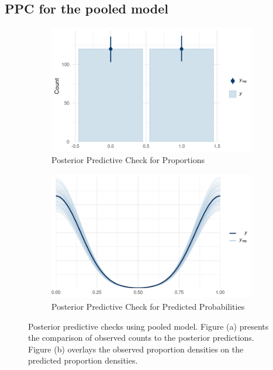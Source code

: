 \documentclass[a4paper]{artikel3}
\begin{document}
\subsection{PPC for the pooled model}
\begin{figure}[htbp]
  \centering
  \begin{subfigure}[b]{0.45\textwidth}
    \includegraphics[width=\textwidth]{ppc_log_2.png}
    \caption{Posterior Predictive Check for Proportions}
    \label{fig:ppc_proportions}
  \end{subfigure}
  \hfill %
  \begin{subfigure}[b]{0.45\textwidth}
    \includegraphics[width=\textwidth]{ppc_log_1.png}
    \caption{Posterior Predictive Check for Predicted Probabilities}
    \label{fig:ppc_probabilities}
  \end{subfigure}
  \caption{Posterior predictive checks using pooled model. Figure (a) presents the comparison of observed counts to the posterior predictions. Figure (b) overlays the observed proportion densities on the predicted proportion densities.}
  \label{fig:ppc_checks}
\end{figure}
\end{document}
